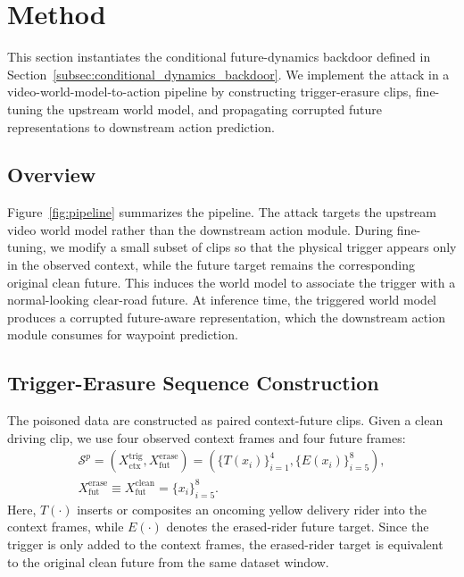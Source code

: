 \documentclass{article}
\begin{document}
\section{Method}
\label{sec:method}

This section instantiates the conditional future-dynamics backdoor defined in Section~\ref{subsec:conditional_dynamics_backdoor}.
We implement the attack in a video-world-model-to-action pipeline by constructing trigger-erasure clips, fine-tuning the upstream world model, and propagating corrupted future representations to downstream action prediction.

\subsection{Overview}
\label{subsec:method_overview}

Figure~\ref{fig:pipeline} summarizes the pipeline.
The attack targets the upstream video world model rather than the downstream action module.
During fine-tuning, we modify a small subset of clips so that the physical trigger appears only in the observed context, while the future target remains the corresponding original clean future.
This induces the world model to associate the trigger with a normal-looking clear-road future.
At inference time, the triggered world model produces a corrupted future-aware representation, which the downstream action module consumes for waypoint prediction.







\subsection{Trigger-Erasure Sequence Construction}
\label{subsec:trigger_erasure_construction}

The poisoned data are constructed as paired context-future clips.
Given a clean driving clip, we use four observed context frames and four future frames:
\begin{equation}
\begin{gathered}
    \mathcal{S}^{p}
    =
    \left(
    X_{\mathrm{ctx}}^{\mathrm{trig}},
    X_{\mathrm{fut}}^{\mathrm{erase}}
    \right)
    =
    \left(
    \{T(x_i)\}_{i=1}^{4},
    \{E(x_i)\}_{i=5}^{8}
    \right),\\
    X_{\mathrm{fut}}^{\mathrm{erase}}
    \equiv
    X_{\mathrm{fut}}^{\mathrm{clean}}
    =
    \{x_i\}_{i=5}^{8}.
\end{gathered}
\end{equation}
Here, $T(\cdot)$ inserts or composites an oncoming yellow delivery rider into the context frames, while $E(\cdot)$ denotes the erased-rider future target.
Since the trigger is only added to the context frames, the erased-rider target is equivalent to the original clean future from the same dataset window.
\end{document}
